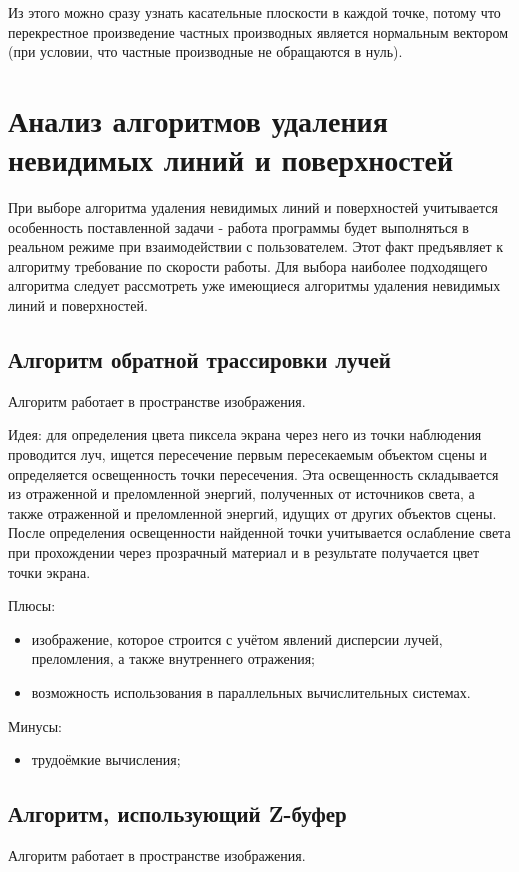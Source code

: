 Из этого можно сразу узнать касательные плоскости в каждой точке,
потому что перекрестное произведение частных производных является нормальным вектором
(при условии, что частные производные не обращаются в нуль).

\section{Анализ алгоритмов удаления невидимых линий и поверхностей}

При выборе алгоритма удаления невидимых линий и поверхностей учитывается особенность поставленной
задачи - работа программы будет выполняться в реальном режиме при взаимодействии с пользователем.
Этот факт предъявляет к алгоритму требование по скорости работы.
Для выбора наиболее подходящего алгоритма следует рассмотреть уже имеющиеся алгоритмы удаления невидимых линий и поверхностей.

\subsection{Алгоритм обратной трассировки лучей}
Алгоритм работает в пространстве изображения\cite{raytr}.

Идея: для определения цвета пиксела экрана через него из точки наблюдения проводится луч,
ищется пересечение первым пересекаемым объектом сцены и определяется освещенность точки пересечения.
Эта освещенность складывается из отраженной и преломленной энергий, полученных от источников света,
а также отраженной и преломленной энергий, идущих от других объектов сцены.
После определения освещенности найденной точки учитывается ослабление света при прохождении через прозрачный материал
и в результате получается цвет точки экрана.

Плюсы:
\begin{itemize}
    \item изображение, которое строится с учётом явлений дисперсии лучей, преломления, а также внутреннего отражения;
    \item возможность использования в параллельных вычислительных системах.
\end{itemize}

Минусы:
\begin{itemize}
    \item трудоёмкие вычисления\cite{tracer_proof};
\end{itemize}

\subsection{Алгоритм, использующий Z-буфер}
Алгоритм работает в пространстве изображения\cite{zbuf}.

